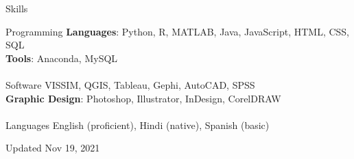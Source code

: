 \documentclass{resume} %
\begin{document}
    \begin{rSection}{Skills}
        \begin{tabbing}
            Programming \hspace*{0.5cm} \= \textbf{Languages}: Python, R, MATLAB, Java, JavaScript, HTML, CSS, SQL
            \\ \> \textbf{Tools}: Anaconda, MySQL \\
            \\ Software
            \> VISSIM, QGIS, Tableau, Gephi, AutoCAD, SPSS
            \\ \> \textbf{Graphic Design}: Photoshop, Illustrator, InDesign, CorelDRAW \\
            \\ Languages \> English (proficient), Hindi (native), Spanish (basic)
        \end{tabbing}
    \end{rSection}

    \vspace*{\fill}
    \centering Updated Nov 19, 2021
\end{document}
